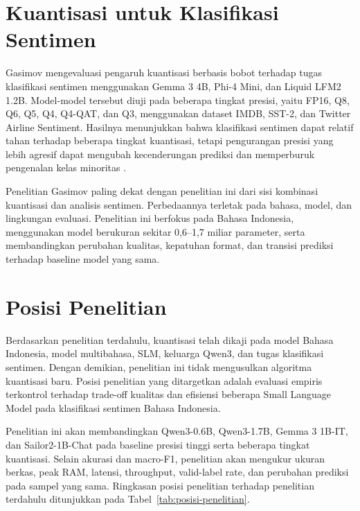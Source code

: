 \section{Kuantisasi untuk Klasifikasi Sentimen}

Gasimov mengevaluasi pengaruh kuantisasi berbasis bobot terhadap tugas klasifikasi sentimen menggunakan Gemma 3 4B, Phi-4 Mini, dan Liquid LFM2 1.2B. Model-model tersebut diuji pada beberapa tingkat presisi, yaitu FP16, Q8, Q6, Q5, Q4, Q4-QAT, dan Q3, menggunakan dataset IMDB, SST-2, dan Twitter Airline Sentiment. Hasilnya menunjukkan bahwa klasifikasi sentimen dapat relatif tahan terhadap beberapa tingkat kuantisasi, tetapi pengurangan presisi yang lebih agresif dapat mengubah kecenderungan prediksi dan memperburuk pengenalan kelas minoritas \citep{gasimov2026sentiment}.

Penelitian Gasimov paling dekat dengan penelitian ini dari sisi kombinasi kuantisasi dan analisis sentimen. Perbedaannya terletak pada bahasa, model, dan lingkungan evaluasi. Penelitian ini berfokus pada Bahasa Indonesia, menggunakan model berukuran sekitar 0,6--1,7 miliar parameter, serta membandingkan perubahan kualitas, kepatuhan format, dan transisi prediksi terhadap baseline model yang sama.

\section{Posisi Penelitian}

Berdasarkan penelitian terdahulu, kuantisasi telah dikaji pada model Bahasa Indonesia, model multibahasa, SLM, keluarga Qwen3, dan tugas klasifikasi sentimen. Dengan demikian, penelitian ini tidak mengusulkan algoritma kuantisasi baru. Posisi penelitian yang ditargetkan adalah evaluasi empiris terkontrol terhadap trade-off kualitas dan efisiensi beberapa Small Language Model pada klasifikasi sentimen Bahasa Indonesia.

Penelitian ini akan membandingkan Qwen3-0.6B, Qwen3-1.7B, Gemma 3 1B-IT, dan Sailor2-1B-Chat pada baseline presisi tinggi serta beberapa tingkat kuantisasi. Selain akurasi dan macro-F1, penelitian akan mengukur ukuran berkas, peak RAM, latensi, throughput, valid-label rate, dan perubahan prediksi pada sampel yang sama. Ringkasan posisi penelitian terhadap penelitian terdahulu ditunjukkan pada Tabel~\ref{tab:posisi-penelitian}.

